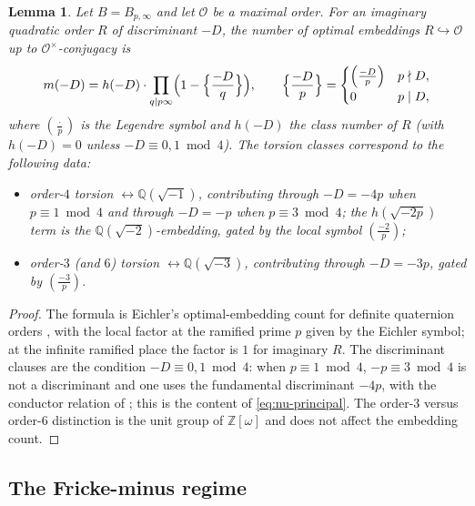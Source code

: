 \documentclass[11pt]{amsart}
\theoremstyle{plain}
\newtheorem{lemma}[theorem]{Lemma}
\theoremstyle{definition}
\newcommand{\Q}{\mathbb{Q}}
\newcommand{\Z}{\mathbb{Z}}
\newcommand{\Onorm}{\mathcal{O}}
\providecommand{\kro}[2]{\left(\frac{#1}{#2}\right)}
\begin{document}
	\begin{lemma}	\label{lem:twist}
		Let $B=B_{p,\infty}$ and let $\Onorm$ be a maximal order. For an imaginary
		quadratic order $R$ of discriminant $-D$, the number of optimal embeddings
		$R\hookrightarrow\Onorm$ up to $\Onorm^\times$-conjugacy is
		\[
		m(-D)=h(-D)\cdot\prod_{q\mid p\infty}
		\Bigl(1-\Bigl\{\frac{-D}{q}\Bigr\}\Bigr),
		\qquad
		\Bigl\{\frac{-D}{p}\Bigr\}=
		\begin{cases}\kro{-D}{p} & p\nmid D,\\ 0 & p\mid D,\end{cases}
		\]
		where $\kro{\cdot}{p}$ is the Legendre symbol and $h(-D)$ the class number
		of $R$ (with $h(-D)=0$ unless $-D\equiv0,1\bmod4$). The torsion classes
		correspond to the following data:
		\begin{itemize}
			\item[$(\ell{=}2)$] order-$4$ torsion $\leftrightarrow\Q(\sqrt{-1})$,
			contributing through $-D=-4p$ when $p\equiv1\bmod4$ and through $-D=-p$
			when $p\equiv3\bmod4$; the $h(\sqrt{-2p})$ term is the
			$\Q(\sqrt{-2})$-embedding, gated by the local symbol $\kro{-2}{p}$;
			\item[$(\ell{=}3)$] order-$3$ (and $6$) torsion $\leftrightarrow\Q(\sqrt{-3})$,
			contributing through $-D=-3p$, gated by $\kro{-3}{p}$.
		\end{itemize}
	\end{lemma}
	
	\begin{proof}
		The formula is Eichler's optimal-embedding count for definite quaternion
		orders \cite[Ch.~III]{Vigneras}, with the local factor at the ramified
		prime $p$ given by the Eichler symbol; at the infinite ramified place the
		factor is $1$ for imaginary $R$. The discriminant clauses are the
		condition $-D\equiv0,1\bmod4$: when $p\equiv1\bmod4$, $-p\equiv3\bmod4$
		is not a discriminant and one uses the fundamental discriminant $-4p$,
		with the conductor relation of \cite[Cor.~7.28]{Cox}; this is the content
		of \eqref{eq:nu-principal}. The order-$3$ versus order-$6$ distinction is
		the unit group of $\Z[\omega]$ and does not affect the embedding count.
	\end{proof}
	
	\subsection{The Fricke-minus regime}
	\label{ss:uncond-regime}
	
\end{document}
